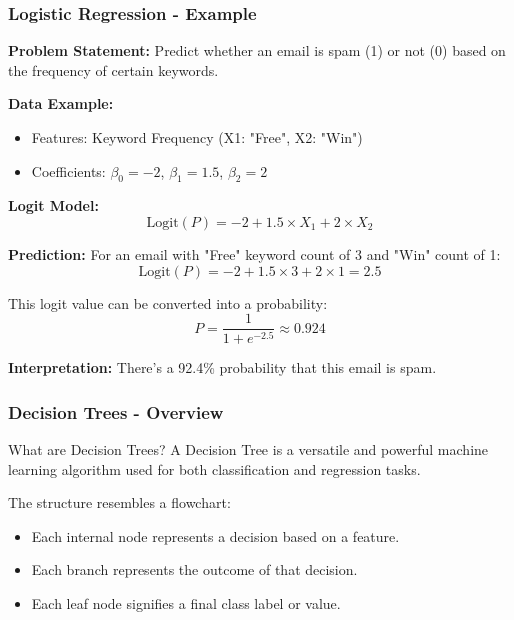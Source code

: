 \documentclass[aspectratio=169]{beamer}
\begin{document}
\begin{frame}[fragile]
    \frametitle{Logistic Regression - Example}
    \textbf{Problem Statement:} Predict whether an email is spam (1) or not (0) based on the frequency of certain keywords.

    \textbf{Data Example:}
    \begin{itemize}
        \item Features: Keyword Frequency (X1: "Free", X2: "Win")
        \item Coefficients: $\beta_0 = -2$, $\beta_1 = 1.5$, $\beta_2 = 2$
    \end{itemize}

    \textbf{Logit Model:}
    \begin{equation}
    \text{Logit}(P) = -2 + 1.5 \times X_1 + 2 \times X_2
    \end{equation}

    \textbf{Prediction:}
    For an email with "Free" keyword count of 3 and "Win" count of 1:
    \begin{equation}
    \text{Logit}(P) = -2 + 1.5 \times 3 + 2 \times 1 = 2.5
    \end{equation}
    
    This logit value can be converted into a probability:
    \begin{equation}
    P = \frac{1}{1 + e^{-2.5}} \approx 0.924
    \end{equation}
    
    \textbf{Interpretation:} There’s a 92.4\% probability that this email is spam.
\end{frame}

\begin{frame}[fragile]
    \frametitle{Decision Trees - Overview}
    \begin{block}{What are Decision Trees?}
        A Decision Tree is a versatile and powerful machine learning algorithm used for both classification and regression tasks. 
    \end{block}
    The structure resembles a flowchart:
    \begin{itemize}
        \item Each internal node represents a decision based on a feature.
        \item Each branch represents the outcome of that decision.
        \item Each leaf node signifies a final class label or value.
    \end{itemize}
\end{frame}
\end{document}
